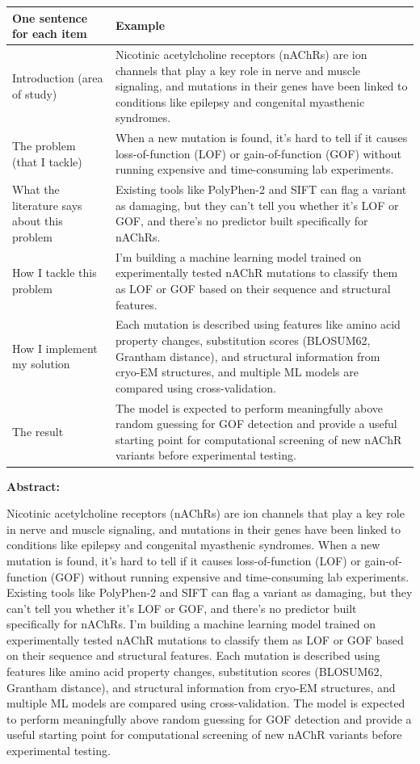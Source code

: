 \documentclass[12pt,a4paper]{article}
\begin{document}
\begin{table}[h!]
\centering
\renewcommand{\arraystretch}{1.5}
\begin{tabularx}{\textwidth}{|L{3.5cm}|X|}
\hline
\textbf{One sentence for each item} & \textbf{Example} \\
\hline
Introduction (area of study) &
Nicotinic acetylcholine receptors (nAChRs) are ion channels that play a key role in nerve and muscle signaling, and mutations in their genes have been linked to conditions like epilepsy and congenital myasthenic syndromes. \\
\hline
The problem (that I tackle) &
When a new mutation is found, it's hard to tell if it causes loss-of-function (LOF) or gain-of-function (GOF) without running expensive and time-consuming lab experiments. \\
\hline
What the literature says about this problem &
Existing tools like PolyPhen-2 and SIFT can flag a variant as damaging, but they can't tell you whether it's LOF or GOF, and there's no predictor built specifically for nAChRs. \\
\hline
How I tackle this problem &
I'm building a machine learning model trained on experimentally tested nAChR mutations to classify them as LOF or GOF based on their sequence and structural features. \\
\hline
How I implement my solution &
Each mutation is described using features like amino acid property changes, substitution scores (BLOSUM62, Grantham distance), and structural information from cryo-EM structures, and multiple ML models are compared using cross-validation. \\
\hline
The result &
The model is expected to perform meaningfully above random guessing for GOF detection and provide a useful starting point for computational screening of new nAChR variants before experimental testing. \\
\hline
\end{tabularx}
\end{table}

\textbf{Abstract:}

Nicotinic acetylcholine receptors (nAChRs) are ion channels that play a key role in nerve and muscle signaling, and mutations in their genes have been linked to conditions like epilepsy and congenital myasthenic syndromes. When a new mutation is found, it's hard to tell if it causes loss-of-function (LOF) or gain-of-function (GOF) without running expensive and time-consuming lab experiments. Existing tools like PolyPhen-2 and SIFT can flag a variant as damaging, but they can't tell you whether it's LOF or GOF, and there's no predictor built specifically for nAChRs. I'm building a machine learning model trained on experimentally tested nAChR mutations to classify them as LOF or GOF based on their sequence and structural features. Each mutation is described using features like amino acid property changes, substitution scores (BLOSUM62, Grantham distance), and structural information from cryo-EM structures, and multiple ML models are compared using cross-validation. The model is expected to perform meaningfully above random guessing for GOF detection and provide a useful starting point for computational screening of new nAChR variants before experimental testing.
\end{document}
